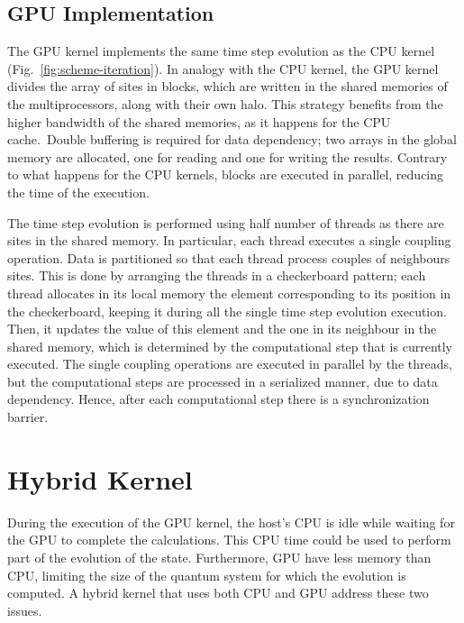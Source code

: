 \subsection{GPU Implementation}
The GPU kernel implements the same time step evolution as the CPU kernel (Fig.~\ref{fig:scheme-iteration}). In analogy with the CPU kernel, the  GPU kernel divides the array of sites in blocks, which are written in the shared memories of the multiprocessors, along with their own halo. This strategy benefits from the higher bandwidth of the shared memories, as it happens for the CPU cache.~Double buffering is required for data dependency; two arrays in the global memory are allocated, one for reading and one for writing the results. Contrary to what happens for the CPU kernels, blocks are executed in parallel, reducing the time of the execution. 

The time step evolution is performed using half number of threads as there are sites in the shared memory. In particular, each thread executes a single coupling operation. Data is partitioned so that each thread process couples of neighbours sites. This is done by arranging the threads in a checkerboard pattern; each thread allocates in its local memory the element corresponding to its position in the checkerboard, keeping it during all the single time step evolution execution. Then, it updates the value of this element and the one in its neighbour in the shared memory, which is determined by the computational step that is currently executed. The single coupling operations are executed in parallel by the threads, but the computational steps are processed in a serialized manner, due to data dependency. Hence, after each computational step there is a synchronization barrier. 

\section{Hybrid Kernel}
During the execution of the GPU kernel, the host's CPU is idle while waiting for the GPU to complete the calculations. This CPU time could be used to perform part of the evolution of the state. Furthermore, GPU have less memory than CPU, limiting the size of the quantum system for which the evolution is computed. A hybrid kernel that uses both CPU and GPU address these two issues.

